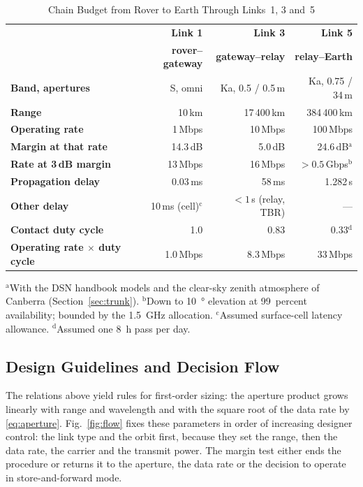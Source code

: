 \documentclass{IEEEoj}
\begin{document}
\begin{table}[!t]
\caption{Chain Budget from Rover to Earth Through Links~1, 3 and~5}
\label{tab:chain}
\centering
\footnotesize
\setlength{\tabcolsep}{3pt}
\begin{tabularx}{\columnwidth}{@{}>{\raggedright\arraybackslash\bfseries}Xrrr}
\toprule
\rowcolor{tabhead} & \textbf{Link 1} & \textbf{Link 3} & \textbf{Link 5} \\
\rowcolor{tabhead} & \textbf{rover--gateway} & \textbf{gateway--relay} & \textbf{relay--Earth} \\
\midrule
Band, apertures & S, omni & Ka, 0.5 / 0.5\,m & Ka, 0.75 / 34\,m \\
Range & 10\,km & 17\,400\,km & 384\,400\,km \\
Operating rate & 1\,Mbps & 10\,Mbps & 100\,Mbps \\
Margin at that rate & 14.3\,dB & 5.0\,dB & 24.6\,dB$^{\mathrm{a}}$ \\
Rate at 3\,dB margin & 13\,Mbps & 16\,Mbps & ${>}0.5$\,Gbps$^{\mathrm{b}}$ \\
Propagation delay & 0.03\,ms & 58\,ms & 1.282\,s \\
Other delay & 10\,ms (cell)$^{\mathrm{c}}$ & ${<}1$\,s (relay, TBR) & --- \\
Contact duty cycle & 1.0 & 0.83 & 0.33$^{\mathrm{d}}$ \\
\rowcolor{tabkey}Operating rate $\times$ duty cycle & 1.0\,Mbps & 8.3\,Mbps & 33\,Mbps \\
\bottomrule
\end{tabularx}
\par\smallskip\raggedright\footnotesize $^{\mathrm{a}}$With the DSN handbook models and the clear-sky zenith atmosphere of Canberra (Section~\ref{sec:trunk}). $^{\mathrm{b}}$Down to \SI{10}{\degree} elevation at 99~percent availability; bounded by the \SI{1.5}{GHz} allocation. $^{\mathrm{c}}$Assumed surface-cell latency allowance. $^{\mathrm{d}}$Assumed one \SI{8}{h} pass per day.
\end{table}

\subsection{Design Guidelines and Decision Flow}


The relations above yield rules for first-order sizing: the aperture product grows linearly with range and wavelength and with the square root of the data rate by \eqref{eq:aperture}. Fig.~\ref{fig:flow} fixes these parameters in order of increasing designer control: the link type and the orbit first, because they set the range, then the data rate, the carrier and the transmit power. The margin test either ends the procedure or returns it to the aperture, the data rate or the decision to operate in store-and-forward mode.
\end{document}
